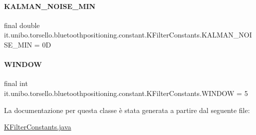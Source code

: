 \paragraph{\texorpdfstring{K\+A\+L\+M\+A\+N\+\_\+\+N\+O\+I\+S\+E\+\_\+\+M\+IN}{KALMAN\_NOISE\_MIN}}
{\footnotesize\ttfamily final double it.\+unibo.\+torsello.\+bluetoothpositioning.\+constant.\+K\+Filter\+Constants.\+K\+A\+L\+M\+A\+N\+\_\+\+N\+O\+I\+S\+E\+\_\+\+M\+IN = 0D\hspace{0.3cm}{\ttfamily [static]}}

\hypertarget{classit_1_1unibo_1_1torsello_1_1bluetoothpositioning_1_1constant_1_1KFilterConstants_a3c2618e53ad77fcb50785f62868e4c9c_a3c2618e53ad77fcb50785f62868e4c9c}{}\label{classit_1_1unibo_1_1torsello_1_1bluetoothpositioning_1_1constant_1_1KFilterConstants_a3c2618e53ad77fcb50785f62868e4c9c_a3c2618e53ad77fcb50785f62868e4c9c} 
\paragraph{\texorpdfstring{W\+I\+N\+D\+OW}{WINDOW}}
{\footnotesize\ttfamily final int it.\+unibo.\+torsello.\+bluetoothpositioning.\+constant.\+K\+Filter\+Constants.\+W\+I\+N\+D\+OW = 5\hspace{0.3cm}{\ttfamily [static]}}



La documentazione per questa classe è stata generata a partire dal seguente file\+:\begin{DoxyCompactItemize}
\item 
\hyperlink{KFilterConstants_8java}{K\+Filter\+Constants.\+java}\end{DoxyCompactItemize}
